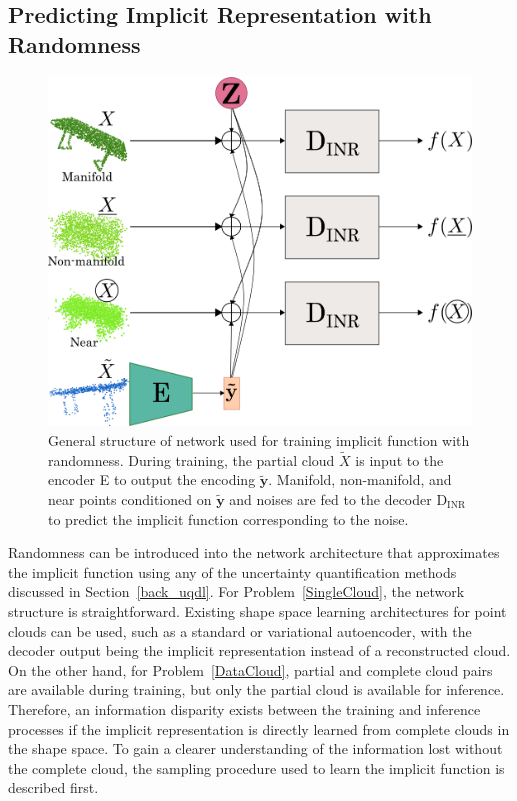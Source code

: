     \subsection{Predicting Implicit Representation with Randomness}
    \begin{figure}[htb]
      \begin{center}
      \includegraphics[width=\linewidth]{figures/inr_network.png}
      \end{center}
      \caption{General structure of network used for training implicit function with randomness. During training, the partial cloud $\tilde{X}$ is input to the encoder E to output the encoding $\mathbf{\tilde{y}}$. Manifold, non-manifold, and near points conditioned on $\mathbf{\tilde{y}}$ and noises are fed to the decoder D$_{\text{INR}}$ to predict the implicit function corresponding to the noise.}\label{fig:inr_net}
    \end{figure}
    Randomness can be introduced into the network architecture that approximates the implicit function using any of the uncertainty quantification methods discussed in Section~\ref {back_uqdl}. For Problem~\ref{SingleCloud}, the network structure is straightforward. Existing shape space learning architectures for point clouds can be used, such as a standard or variational autoencoder, with the decoder output being the implicit representation instead of a reconstructed cloud. On the other hand, for Problem~\ref{DataCloud}, partial and complete cloud pairs are available during training, but only the partial cloud is available for inference. Therefore, an information disparity exists between the training and inference processes if the implicit representation is directly learned from complete clouds in the shape space. To gain a clearer understanding of the information lost without the complete cloud, the sampling procedure used to learn the implicit function is described first.
    \newline
    
